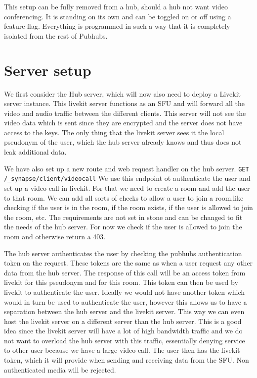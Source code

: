 \documentclass{report}
\begin{document}
    This setup can be fully removed from a hub, should a hub not want video conferencing. It is standing on its own and
    can be toggled on or off using a feature flag. Everything is programmed in such a way that it is completely isolated
    from the rest of Pubhubs.


    \section{Server setup}
    We first consider the Hub server, which will now also need to deploy a Livekit server instance. This livekit server
    functions as an SFU and will forward all the video and audio traffic between the different clients. This server will
    not see the video data which is sent since they are encrypted and the server does not have access to the keys. The
    only thing that the livekit server sees it the local pseudonym of the user, which the hub server already knows and
    thus does not leak additional data.

    We have also set up a new route and web request handler on the hub server.
    \texttt{GET /\_synapse/client/videocall} We use this endpoint ot authenticate the user and set up a video call
    in livekit. For that we need to create a room and add the user to that room. We can add all sorts of checks to allow
    a user to join a room,like checking if the user is in the room, if the room exists, if the user is allowed to
    join the room, etc. The requirements are not set in stone and can be changed to fit the needs of the hub server.
    For now we check if the user is allowed to join the room and otherwise return a 403.

    The hub server authenticates the user by checking the pubhubs authentication token on the request. These tokens are
    the same as when a user request any other data from the hub server. The response of this call will be an
    access token from livekit for this pseudonym and for this room. This token can then be used by livekit to
    authenticate the user. Ideally we would not have another token which would in turn be used to authenticate the
    user, however this allows us to have a separation between the hub server and the livekit server. This way we can
    even host the livekit server on a different server than the hub server. This is a good idea since the
    livekit server will have a lot of high bandwidth traffic and we do not want to overload the hub server with
    this traffic, essentially denying service to other user because we have a large video call. The user then
    has the livekit token, which it will provide when sending and receiving data from the SFU. Non authenticated
    media will be rejected.
\end{document}
